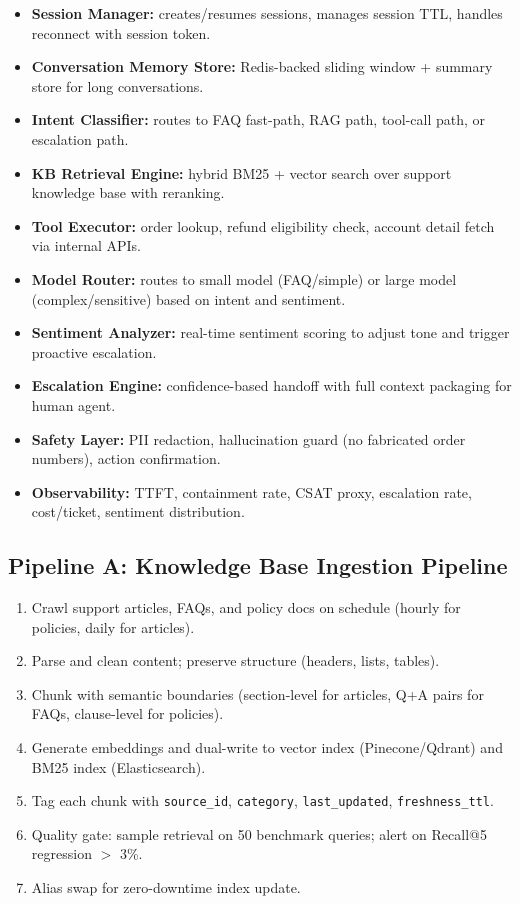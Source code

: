 \begin{itemize}
  \item \textbf{Session Manager:} creates/resumes sessions, manages session TTL, handles reconnect with session token.
  \item \textbf{Conversation Memory Store:} Redis-backed sliding window + summary store for long conversations.
  \item \textbf{Intent Classifier:} routes to FAQ fast-path, RAG path, tool-call path, or escalation path.
  \item \textbf{KB Retrieval Engine:} hybrid BM25 + vector search over support knowledge base with reranking.
  \item \textbf{Tool Executor:} order lookup, refund eligibility check, account detail fetch via internal APIs.
  \item \textbf{Model Router:} routes to small model (FAQ/simple) or large model (complex/sensitive) based on intent and sentiment.
  \item \textbf{Sentiment Analyzer:} real-time sentiment scoring to adjust tone and trigger proactive escalation.
  \item \textbf{Escalation Engine:} confidence-based handoff with full context packaging for human agent.
  \item \textbf{Safety Layer:} PII redaction, hallucination guard (no fabricated order numbers), action confirmation.
  \item \textbf{Observability:} TTFT, containment rate, CSAT proxy, escalation rate, cost/ticket, sentiment distribution.
\end{itemize}

\subsection*{Pipeline A: Knowledge Base Ingestion Pipeline}

\begin{enumerate}
  \item Crawl support articles, FAQs, and policy docs on schedule (hourly for policies, daily for articles).
  \item Parse and clean content; preserve structure (headers, lists, tables).
  \item Chunk with semantic boundaries (section-level for articles, Q+A pairs for FAQs, clause-level for policies).
  \item Generate embeddings and dual-write to vector index (Pinecone/Qdrant) and BM25 index (Elasticsearch).
  \item Tag each chunk with \texttt{source\_id}, \texttt{category}, \texttt{last\_updated}, \texttt{freshness\_ttl}.
  \item Quality gate: sample retrieval on 50 benchmark queries; alert on Recall@5 regression $>$ 3\%.
  \item Alias swap for zero-downtime index update.
\end{enumerate}

